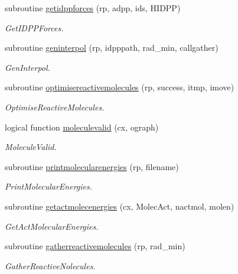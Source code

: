 \begin{DoxyCompactItemize}
subroutine \mbox{\hyperlink{namespacerpath_a65a712550505b1542b4f01af95a18c1a}{getidppforces}} (rp, adpp, ids, H\+I\+D\+PP)
\begin{DoxyCompactList}\small\item\em Get\+I\+D\+P\+P\+Forces. \end{DoxyCompactList}\item 
subroutine \mbox{\hyperlink{namespacerpath_a4749f3881a10626d54544110e0eb1cba}{geninterpol}} (rp, idpppath, rad\+\_\+min, callgather)
\begin{DoxyCompactList}\small\item\em Gen\+Interpol. \end{DoxyCompactList}\item 
subroutine \mbox{\hyperlink{namespacerpath_a2e9f77deb07ac9c56b2068eaf7853a4a}{optimisereactivemolecules}} (rp, success, itmp, imove)
\begin{DoxyCompactList}\small\item\em Optimise\+Reactive\+Molecules. \end{DoxyCompactList}\item 
logical function \mbox{\hyperlink{namespacerpath_aafdcf74818568a7573511f5205a558e0}{moleculevalid}} (cx, ograph)
\begin{DoxyCompactList}\small\item\em Molecule\+Valid. \end{DoxyCompactList}\item 
subroutine \mbox{\hyperlink{namespacerpath_a1af24f3421dc3b87b062668f04eaee22}{printmolecularenergies}} (rp, filename)
\begin{DoxyCompactList}\small\item\em Print\+Molecular\+Energies. \end{DoxyCompactList}\item 
subroutine \mbox{\hyperlink{namespacerpath_ab03d1a925ddda8a471cc0faf8bc393c6}{getactmolecenergies}} (cx, Molec\+Act, nactmol, molen)
\begin{DoxyCompactList}\small\item\em Get\+Act\+Molecular\+Energies. \end{DoxyCompactList}\item 
subroutine \mbox{\hyperlink{namespacerpath_a9499e691ae9b7d354e0c84bb147b41ab}{gatherreactivemolecules}} (rp, rad\+\_\+min)
\begin{DoxyCompactList}\small\item\em Gather\+Reactive\+Nolecules. \end{DoxyCompactList}\item 

\end{DoxyCompactItemize}
